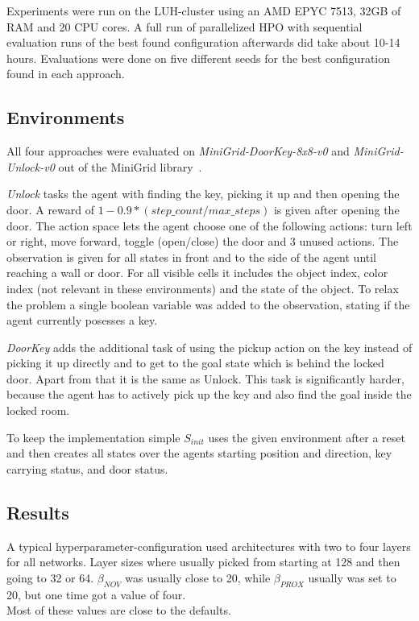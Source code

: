 \documentclass{article}
\begin{document}
Experiments were run on the LUH-cluster using an AMD EPYC 7513, 32GB of RAM and 20 CPU cores. A full run of parallelized HPO with sequential evaluation runs of the best found configuration afterwards did take about 10-14 hours. Evaluations were done on five different seeds for the best configuration found in each approach.

\subsection{Environments}
\label{sec:environments}

All four approaches were evaluated on \textit{MiniGrid-DoorKey-8x8-v0} and \textit{MiniGrid-Unlock-v0} out of the MiniGrid library~\citep{minigrid}.

\textit{Unlock} tasks the agent with finding the key, picking it up and then opening the door. A reward of $1 - 0.9 * (step\_count / max\_steps)$ is given after opening the door. The action space lets the agent choose one of the following actions: turn left or right, move forward, toggle (open/close) the door and 3 unused actions. The observation is given for all states in front and to the side of the agent until reaching a wall or door. For all visible cells it includes the object index, color index (not relevant in these environments) and the state of the object. To relax the problem a single boolean variable was added to the observation, stating if the agent currently posesses a key.

\textit{DoorKey} adds the additional task of using the pickup action on the key instead of picking it up directly and to get to the goal state which is behind the locked door. Apart from that it is the same as Unlock. This task is significantly harder, because the agent has to actively pick up the key and also find the goal inside the locked room.

To keep the implementation simple $S_{init}$ uses the given environment after a reset and then creates all states over the agents starting position and direction, key carrying status, and door status.

\subsection{Results}
\label{sec:results}

A typical hyperparameter-configuration used architectures with two to four layers for all networks. Layer sizes where usually picked from starting at 128 and then going to 32 or 64. $\beta_{NOV}$ was usually close to 20, while $\beta_{PROX}$ usually was set to 20, but one time got a value of four. \\
Most of these values are close to the defaults.
\end{document}
